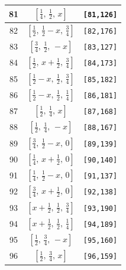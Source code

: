 \documentclass[fleqn,8pt]{jsarticle}
\begin{document}
\begin{longtable}{ccc}
81 & $\left[ \frac{1}{4},\, \frac{1}{2},\, x \right]$ & {\tt [81,126]} \\ \hline
82 & $\left[ \frac{1}{2},\, \frac{1}{2} - x,\, \frac{3}{4} \right]$ & {\tt [82,176]} \\ \hline
83 & $\left[ \frac{3}{4},\, \frac{1}{2},\, - x \right]$ & {\tt [83,127]} \\ \hline
84 & $\left[ \frac{1}{2},\, x + \frac{1}{2},\, \frac{3}{4} \right]$ & {\tt [84,173]} \\ \hline
85 & $\left[ \frac{1}{2} - x,\, \frac{1}{2},\, \frac{3}{4} \right]$ & {\tt [85,182]} \\ \hline
86 & $\left[ \frac{1}{2} - x,\, \frac{1}{2},\, \frac{1}{4} \right]$ & {\tt [86,181]} \\ \hline
87 & $\left[ \frac{1}{2},\, \frac{1}{4},\, x \right]$ & {\tt [87,168]} \\ \hline
88 & $\left[ \frac{1}{2},\, \frac{1}{4},\, - x \right]$ & {\tt [88,167]} \\ \hline
89 & $\left[ \frac{3}{4},\, \frac{1}{2} - x,\, 0 \right]$ & {\tt [89,139]} \\ \hline
90 & $\left[ \frac{1}{4},\, x + \frac{1}{2},\, 0 \right]$ & {\tt [90,140]} \\ \hline
91 & $\left[ \frac{1}{4},\, \frac{1}{2} - x,\, 0 \right]$ & {\tt [91,137]} \\ \hline
92 & $\left[ \frac{3}{4},\, x + \frac{1}{2},\, 0 \right]$ & {\tt [92,138]} \\ \hline
93 & $\left[ x + \frac{1}{2},\, \frac{1}{2},\, \frac{3}{4} \right]$ & {\tt [93,190]} \\ \hline
94 & $\left[ x + \frac{1}{2},\, \frac{1}{2},\, \frac{1}{4} \right]$ & {\tt [94,189]} \\ \hline
95 & $\left[ \frac{1}{2},\, \frac{3}{4},\, - x \right]$ & {\tt [95,160]} \\ \hline
96 & $\left[ \frac{1}{2},\, \frac{3}{4},\, x \right]$ & {\tt [96,159]} \\
\end{longtable}
\renewcommand{\arraystretch}{1.2}
\end{document}
